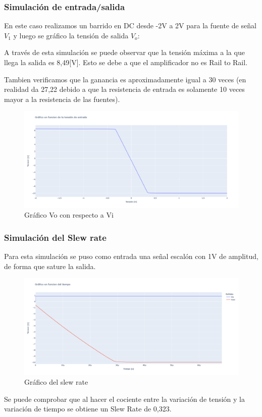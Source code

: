 \subsubsection{Simulación de entrada/salida}

En este caso realizamos un barrido en DC desde -2V a 2V para la fuente de señal $V_1$ y luego se gráfico la tensión de salida $V_o$:

A través de esta simulación se puede observar que la tensión máxima a la que llega la salida es 8,49[V]. Esto se debe a que el amplificador no es Rail to Rail. 

Tambien verificamos que la ganancia es aproximadamente igual a 30 veces (en realidad da 27,22 debido a que la resistencia de entrada es solamente 10 veces mayor a la resistencia de las fuentes).

\newpage

\begin{figure}[h!]
    \centering
    \includegraphics[width=1.0\linewidth]{img/Lab2_1b_Salida_Entrada.png}
    \caption{Gráfico Vo con respecto a Vi}
    \label{fig:vo_vi}
\end{figure}

\vspace{1em}

\subsubsection{Simulación del Slew rate }

Para esta simulación se puso como entrada una señal escalón con 1V de amplitud, de forma que sature la salida. 

\begin{figure}[h!]
    \centering
    \includegraphics[width=0.90\linewidth]{img/Lab2_1b_SlewRate.png}
    \caption{Gráfico del slew rate}
    \label{fig:slew_rate}
\end{figure}
Se puede comprobar que al hacer el cociente entre la variación de tensión y la variación de tiempo se obtiene un Slew Rate de 0,323.

